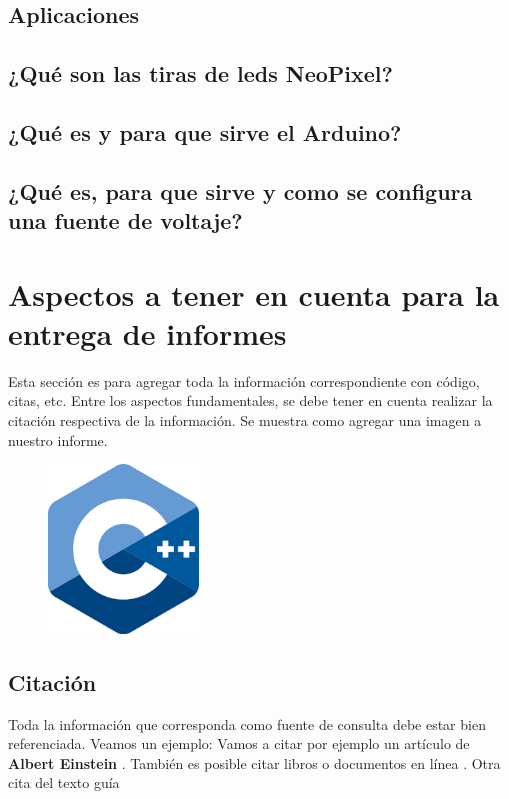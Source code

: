 \documentclass{article}
\begin{document}
\subsection{Aplicaciones}

\subsection{¿Qué son las tiras de leds NeoPixel?}
\subsection{¿Qué es y para que sirve el Arduino?}

\subsection{¿Qué es, para que sirve y como se configura una fuente de voltaje?}

\section{Aspectos a tener en cuenta para la entrega de informes} \label{contenido}
Esta sección es para agregar toda la información correspondiente con código, citas, etc.\newline
Entre los aspectos fundamentales, se debe tener en cuenta realizar la citación respectiva de la información.\newline
Se muestra como agregar una imagen a nuestro informe.

\begin{figure}[!ht]
\includegraphics[width=4cm]{cpplogo.png}
\centering
\end{figure}

\subsection{Citación}
Toda la información que corresponda como fuente de consulta debe estar bien referenciada. Veamos un ejemplo:\newline
Vamos a citar por ejemplo un artículo de \textbf{Albert Einstein} \cite{einstein}.
También es posible citar libros \cite{dirac} o documentos en línea \cite{knuthwebsite}.
\newline
Otra cita del texto guía \cite{deitel1999c++}
\end{document}
